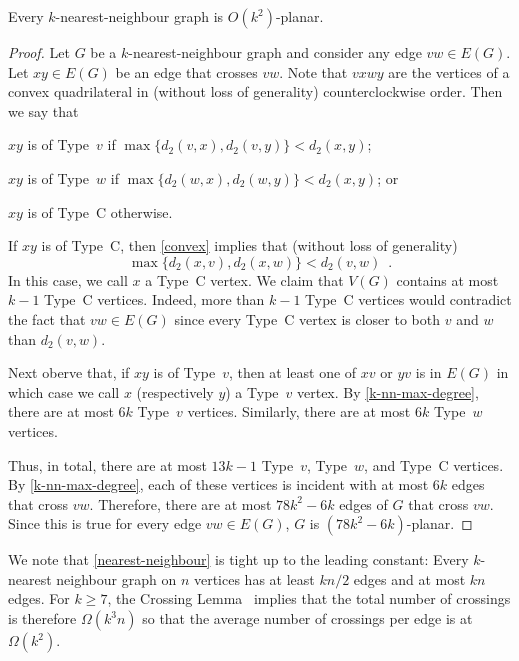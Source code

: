 \documentclass{patmorin}
\renewcommand{\ge}{\geqslant}
\begin{document}
\begin{lem}
\label{nearest-neighbour}
  Every $k$-nearest-neighbour graph is $O(k^2)$-planar.
\end{lem}

\begin{proof}
  Let $G$ be a $k$-nearest-neighbour graph and consider any edge $vw\in E(G)$.
  Let $xy\in E(G)$ be an edge that crosses $vw$.  Note that $vxwy$ are the vertices of a convex quadrilateral in (without loss of generality) counterclockwise order. Then we say that 
  \begin{compactenum}
    \item $xy$ is of Type~$v$ if $\max\{d_2(v,x), d_2(v,y)\}< d_2(x,y)$;
    \item $xy$ is of Type~$w$ if $\max\{d_2(w,x), d_2(w,y)\}< d_2(x,y)$; or
    \item $xy$ is of Type~C otherwise.
  \end{compactenum}
  If $xy$ is of Type~C, then \cref{convex} implies that (without loss of generality) 
  $$\max\{d_2(x,v),d_2(x,w)\} < d_2(v,w)\enspace.$$ 
   In this case, we call $x$ a Type~C vertex.  We claim that $V(G)$ contains at most $k-1$ Type~C vertices.  Indeed, more than $k-1$ Type~C vertices would contradict the fact that $vw\in E(G)$ since every Type~C vertex is closer to both $v$ and $w$ than $d_2(v,w)$.
  
  Next oberve that, if $xy$ is of Type~$v$, then at least one of $xv$ or $yv$ is in $E(G)$ in which case we call $x$ (respectively $y$) a Type~$v$ vertex.  By \cref{k-nn-max-degree}, there are at most $6k$ Type~$v$ vertices.  Similarly, there are at most $6k$ Type~$w$ vertices.
  
  Thus, in total, there are at most $13k-1$ Type~$v$, Type~$w$, and Type~C vertices. By \cref{k-nn-max-degree}, each of these vertices is incident with at most $6k$ edges that cross $vw$. Therefore, there are at most $78k^2-6k$ edges of $G$ that cross $vw$.  Since this is true for every edge $vw\in E(G)$, $G$ is $(78k^2-6k)$-planar.
\end{proof}

We note that \cref{nearest-neighbour} is tight up to the leading constant:  Every $k$-nearest neighbour graph on $n$ vertices has at least $kn/2$ edges and at most $kn$ edges.  For $k\ge 7$, the Crossing Lemma~\citep{ajtai.chvatal.ea:crossing-free,leighton:complexity} implies that the total number of crossings is therefore $\Omega(k^3n)$ so that the average number of crossings per edge is at $\Omega(k^2)$.
\end{document}
